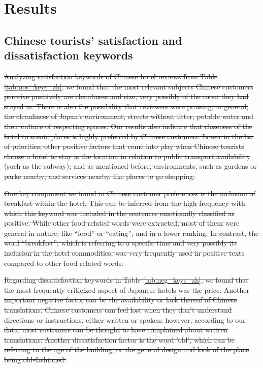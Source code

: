 \documentclass[review]{elsarticle}
\providecommand{\DIFdel}[1]{{\protect\color{red}\sout{#1}}}                      %
\providecommand{\DIFdelbegin}{} %
\newcommand{\DIFscaledelfig}{0.5}
\newlength{\DIFdelgraphicswidth} %
\newlength{\DIFdelgraphicsheight} %
\newcommand{\DIFdelincludegraphics}[2][]{%
\sbox{\DIFdelgraphicsbox}{\DIFOincludegraphics[#1]{#2}}%
\settoboxwidth{\DIFdelgraphicswidth}{\DIFdelgraphicsbox} %
\settoboxtotalheight{\DIFdelgraphicsheight}{\DIFdelgraphicsbox} %
\scalebox{\DIFscaledelfig}{%
\parbox[b]{\DIFdelgraphicswidth}{\usebox{\DIFdelgraphicsbox}\\[-\baselineskip] \rule{\DIFdelgraphicswidth}{0em}}\llap{\resizebox{\DIFdelgraphicswidth}{\DIFdelgraphicsheight}{%
\setlength{\unitlength}{\DIFdelgraphicswidth}%
\begin{picture}(1,1)%
\thicklines\linethickness{2pt} %
{\color[rgb]{1,0,0}\put(0,0){\framebox(1,1){}}}%
{\color[rgb]{1,0,0}\put(0,0){\line( 1,1){1}}}%
{\color[rgb]{1,0,0}\put(0,1){\line(1,-1){1}}}%
\end{picture}%
}\hspace*{3pt}}} %
} %
\DeclareRobustCommand{\DIFdelbegin}{\DIFOdelbegin \let\includegraphics\DIFdelincludegraphics} %
\begin{document}
\section{Results}\label{results}

\subsection{Chinese tourists' satisfaction and dissatisfaction keywords}

\DIFdelbegin\DIFdel{Analyzing satisfaction keywords of Chinese hotel reviews from Table \ref{tab:pos_keys_zh}, we found that the most relevant subjects Chinese customers perceive positively are cleanliness and size, very possibly of the room they had stayed in. There is also the possibility that reviewers were praising, in general, the cleanliness of Japan’s environment, streets without litter, potable water and their culture of respecting spaces. Our results also indicate that closeness of the hotel to scenic places is highly preferred by Chinese customers. Lower in the list of priorities, other positive factors that come into play when Chinese tourists choose a hotel to stay is the location in relation to public transport availability (such as the subway); and as mentioned before, environments, such as gardens or parks nearby; and services nearby, like places to go shopping.} 

\DIFdel{One key component we found in Chinese customer preferences is the inclusion of breakfast within the hotel. This can be inferred from the high frequency with which this keyword was included in the sentences emotionally classified as positive. While other food-related words were extracted, most of them were general in nature, like “food” or “eating”, and in a lower ranking. In contrast, the word “breakfast”, which is referring to a specific time and very possibly its inclusion in the hotel commodities, was very frequently used in positive texts compared to other food-related words.}

\DIFdel{Regarding dissatisfaction keywords in Table \ref{tab:neg_keys_zh}, we found that the most frequently criticized aspect of Japanese hotels was the price. Another important negative factor can be the availability or lack thereof of Chinese translations. Chinese customers can feel lost when they don't understand directions or instructions, either written or spoken; however, according to our data, most customers can be thought to have complained about written translations. Another dissatisfaction factor is the word 'old', which can be referring to the age of the building, or the general design and look of the place being old-fashioned.}
\end{document}
